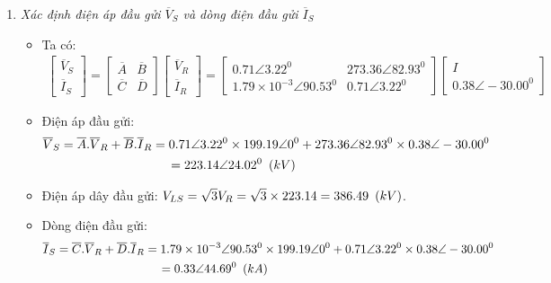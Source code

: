 \begin{enumerate}
\begin{enumerate}[\it a.]
				\item \emph{Xác định điện áp đầu gửi $\overline{V}_S$ và dòng điện đầu gửi $\overline{I}_S$}
					\begin{itemize}
						\item Ta có: 
							\begin{align*}
								\left[{\begin{array}{c}
								\overline{V}_S\\
								\overline{I}_S
								\end{array}
								}\right]
								= 
								\left[{\begin{array}{cc}
								\overline{A} & \overline{B}\\
								\overline{C} & \overline{D}
								\end{array}
								}\right]				
							\left[{\begin{array}{c}
							\overline{V}_R\\
							\overline{I}_R
							\end{array}
							}\right]
							= \left[{\begin{array}{cc}
								0.71 \angle 3.22^0 & 273.36 \angle 82.93^0\\
								1.79 \times 10^{-3} \angle 90.53^0 & 0.71 \angle 3.22^0
								\end{array}
								}\right]				
							\left[{\begin{array}{c}
							I\\
							0.38 \angle -30.00^0
							\end{array}
							}\right]
						\end{align*}
						
						\item Điện áp đầu gửi:
							\begin{align*}
								\overline{V}_S  & = \overline{A}. \overline{V}_R + \overline{B}.\overline{I}_R = 0.71 \angle 3.22^0 \times 199.19 \angle 0^0 + 273.36 \angle 82.93^0 \times 0.38 \angle -30.00^0 \\
								& \hspace{3cm}= 223.14 \angle 24.02^0 \unitp{kV}
								\end{align*}
								
						\item Điện áp dây đầu gửi: $V_{LS}  = \sqrt{3} V_R = \sqrt{3} \times 223.14 = 386.49 ~\left({kV}\right)$.
						\item Dòng điện đầu gửi:
							\begin{align*}								
								\overline{I}_S & = \overline{C}. \overline{V}_R + \overline{D}.\overline{I}_R = 1.79 \times 10^{-3} \angle 90.53^0 \times 199.19 \angle 0^0 + 0.71 \angle 3.22^0 \times 0.38 \angle -30.00^0 \\
								& \hspace{3cm} = 0.33 \angle 44.69^0 \unitp{kA}
							\end{align*}
					\end{itemize}


\end{enumerate}
\end{enumerate}
